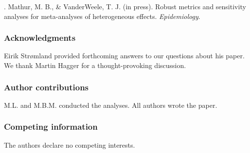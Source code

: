 \documentclass[12pt]{article}
\begin{document}
.  Mathur, M. B., \& VanderWeele, T. J. (in press). Robust metrics and sensitivity analyses for meta-analyses of heterogeneous effects. {\it Epidemiology}.


\subsubsection*{Acknowledgments}
Eirik Strømland provided forthcoming answers to our questions about his paper. We thank Martin Hagger for a thought-provoking discussion. 	

\subsubsection*{Author contributions}
M.L. and M.B.M. conducted the analyses. All authors wrote the paper.

\subsubsection*{Competing information}
The authors declare no competing interests.
\end{document}
